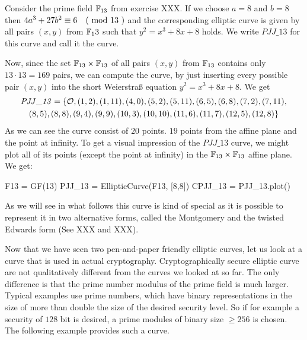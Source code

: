 \begin{example} Consider the prime field $\mathbb{F}_{13}$ from exercise XXX. If we choose $a=8$ and $b=8$ then $4a^3+ 27b^2 \equiv 6 \quad \text{( mod } 13 \text{ )}$ and the corresponding elliptic curve is given by all pairs $(x,y)$ from $\mathbb{F}_13$ such that $y^2=x^3+8x+8$ holds. We write $\mathit{PJJ\_13}$ for this curve and call it the  curve.

Now, since the set $\mathbb{F}_{13}\times \mathbb{F}_{13}$ of all pairs $(x,y)$ from $\mathbb{F}_{13}$ contains only $13\cdot 13=169$ pairs, we can compute the curve, by just inserting every possible pair $(x,y)$ into the short Weierstraß equation $y^2 = x^3 +8x +8$.  We get 
\begin{multline*}
\mathit{PJJ\_13} = \{\mathcal{O}, (1, 2), (1, 11), (4, 0), (5, 2), (5, 11), (6, 5), (6, 8), (7,2), (7, 11), \\ (8, 5), (8, 8), (9, 4), (9, 9), (10, 3), (10,
10), (11, 6), (11, 7), (12, 5), (12, 8)\}
\end{multline*}
As we can see the curve consist of $20$ points. $19$ points from the affine plane and the point at infinity.
To get a visual impression of the $\mathit{PJJ\_13}$ curve, we might plot all of its points (except the point at infinity) in the $\mathbb{F}_{13}\times \mathbb{F}_{13}$ affine plane. We get: 
\begin{sagesilent}
F13 = GF(13)
PJJ_13 = EllipticCurve(F13, [8,8])
CPJJ_13 = PJJ_13.plot()
\end{sagesilent}
\begin{center} 
\end{center}
As we will see in what follows this curve is kind of special as it is possible to represent it in two alternative forms, called the Montgomery and the twisted Edwards form (See XXX and XXX).
\end{example}
Now that we have seen two pen-and-paper friendly elliptic curves, let us look at a curve that is used in actual cryptography. Cryptographically secure elliptic curve are not qualitatively different from the curves we looked at so far. The only difference is that the prime number modulus of the prime field is much larger. Typical examples use prime numbers, which have binary representations in the size of more than double the size of the desired security level. So if for example a security of $128$ bit is desired, a prime modules of binary size $\geq 256$ is chosen. The following example provides such a curve. 

